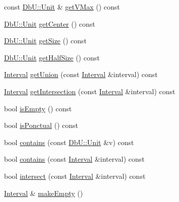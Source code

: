 \begin{DoxyCompactItemize}
\item 
const \mbox{\hyperlink{group__DbUGroup_ga4fbfa3e8c89347af76c9628ea06c4146}{Db\+U\+::\+Unit}} \& \mbox{\hyperlink{classHurricane_1_1Interval_a2f5ec659fde913492f89dc215001acb2}{get\+V\+Max}} () const
\item 
\mbox{\hyperlink{group__DbUGroup_ga4fbfa3e8c89347af76c9628ea06c4146}{Db\+U\+::\+Unit}} \mbox{\hyperlink{classHurricane_1_1Interval_a6d12d0404054c7ccadab1afa6683a561}{get\+Center}} () const
\item 
\mbox{\hyperlink{group__DbUGroup_ga4fbfa3e8c89347af76c9628ea06c4146}{Db\+U\+::\+Unit}} \mbox{\hyperlink{classHurricane_1_1Interval_a61d877fee3986f93c357910cd63f1caa}{get\+Size}} () const
\item 
\mbox{\hyperlink{group__DbUGroup_ga4fbfa3e8c89347af76c9628ea06c4146}{Db\+U\+::\+Unit}} \mbox{\hyperlink{classHurricane_1_1Interval_abe66d75c0854ca0a76189801f0f7d0e3}{get\+Half\+Size}} () const
\item 
\mbox{\hyperlink{classHurricane_1_1Interval}{Interval}} \mbox{\hyperlink{classHurricane_1_1Interval_adaddabee8381860b0d6913ce39bc1911}{get\+Union}} (const \mbox{\hyperlink{classHurricane_1_1Interval}{Interval}} \&interval) const
\item 
\mbox{\hyperlink{classHurricane_1_1Interval}{Interval}} \mbox{\hyperlink{classHurricane_1_1Interval_ad9baf434d669fddf9cd30aa74e0c4486}{get\+Intersection}} (const \mbox{\hyperlink{classHurricane_1_1Interval}{Interval}} \&interval) const
\item 
bool \mbox{\hyperlink{classHurricane_1_1Interval_a5bf0292743d02f861a194c48c823c7ce}{is\+Empty}} () const
\item 
bool \mbox{\hyperlink{classHurricane_1_1Interval_acfc27bb7442f359db7d04c72fa8edeb8}{is\+Ponctual}} () const
\item 
bool \mbox{\hyperlink{classHurricane_1_1Interval_a1f58204f81cd59ae8345e0efd2482bbb}{contains}} (const \mbox{\hyperlink{group__DbUGroup_ga4fbfa3e8c89347af76c9628ea06c4146}{Db\+U\+::\+Unit}} \&v) const
\item 
bool \mbox{\hyperlink{classHurricane_1_1Interval_ae86edb6867cf55459325cc35d971afbd}{contains}} (const \mbox{\hyperlink{classHurricane_1_1Interval}{Interval}} \&interval) const
\item 
bool \mbox{\hyperlink{classHurricane_1_1Interval_acbaccbdd6649a32dd457455d277370f8}{intersect}} (const \mbox{\hyperlink{classHurricane_1_1Interval}{Interval}} \&interval) const
\item 
\mbox{\hyperlink{classHurricane_1_1Interval}{Interval}} \& \mbox{\hyperlink{classHurricane_1_1Interval_a1e171021dcd5c0dc7e8afb0b2324c5ee}{make\+Empty}} ()

\end{DoxyCompactItemize}
